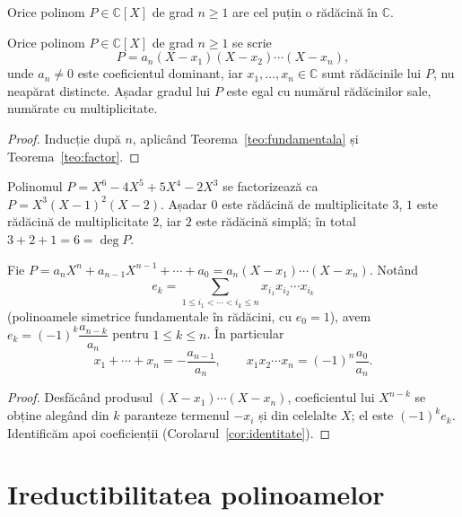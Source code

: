 \begin{teorema}\label{teo:fundamentala}
Orice polinom $P \in \mathbb{C}[X]$ de grad $n \ge 1$ are cel puțin o rădăcină în $\mathbb{C}$.
\end{teorema}

\begin{corolar}\label{cor:scindatC}
Orice polinom $P \in \mathbb{C}[X]$ de grad $n\ge 1$ se scrie
\[
P = a_n (X - x_1)(X - x_2) \cdots (X - x_n),
\]
unde $a_n \neq 0$ este coeficientul dominant, iar $x_1, \ldots, x_n \in \mathbb{C}$ sunt rădăcinile lui $P$, nu neapărat distincte. Așadar gradul lui $P$ este egal cu numărul rădăcinilor sale, numărate cu multiplicitate.
\end{corolar}

\begin{proof}
Inducție după $n$, aplicând Teorema~\ref{teo:fundamentala} și Teorema~\ref{teo:factor}.
\end{proof}

\begin{exemplu}
Polinomul $P = X^{6}-4X^{5}+5X^{4}-2X^{3}$ se factorizează ca $P = X^3 (X - 1)^2 (X - 2)$. Așadar $0$ este rădăcină de multiplicitate $3$, $1$ este rădăcină de multiplicitate $2$, iar $2$ este rădăcină simplă; în total $3+2+1 = 6 = \deg P$.
\end{exemplu}

\begin{teorema}\label{teo:viete}
Fie $P = a_n X^n + a_{n-1}X^{n-1} + \cdots + a_0 = a_n (X - x_1)\cdots(X - x_n)$. Notând
\[
e_k = \sum_{1 \le i_1 < \cdots < i_k \le n} x_{i_1} x_{i_2}\cdots x_{i_k}
\]
(polinoamele simetrice fundamentale în rădăcini, cu $e_0 = 1$), avem $e_k = (-1)^k \dfrac{a_{n-k}}{a_n}$ pentru $1 \le k \le n$. În particular
\[
x_1 + \cdots + x_n = -\frac{a_{n-1}}{a_n}, \qquad x_1 x_2 \cdots x_n = (-1)^n \frac{a_0}{a_n}.
\]
\end{teorema}

\begin{proof}
Desfăcând produsul $(X - x_1)\cdots(X-x_n)$, coeficientul lui $X^{n-k}$ se obține alegând din $k$ paranteze termenul $-x_i$ și din celelalte $X$; el este $(-1)^k e_k$. Identificăm apoi coeficienții (Corolarul~\ref{cor:identitate}).
\end{proof}

\section{Ireductibilitatea polinoamelor}

